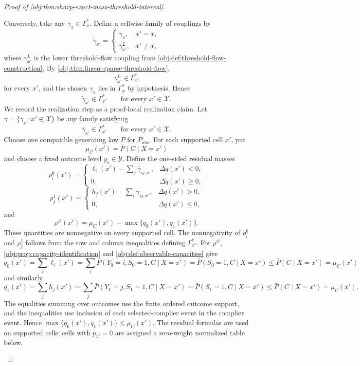 \documentclass[11pt]{article}
\begin{document}
\begin{proof}[Proof of \cref{obj:thm:sharp-exact-mass-threshold-interval}]
\begin{enumerate}
Conversely, take any \(\gamma_x\in\Gamma_x^\ast\).  Define a cellwise family of couplings by
\[
\widetilde\gamma_{x'}=
\begin{cases}
\gamma_x, & x'=x,\\
\gamma_{x'}^L, & x'\ne x,
\end{cases}
\]
where \(\gamma_{x'}^L\) is the lower threshold-flow coupling from
\cref{obj:def:threshold-flow-construction}.  By
\cref{obj:thm:linear-sparse-threshold-flow},
\[
\gamma_{x'}^L\in\Gamma_{x'}^\ast
\]
for every \(x'\), and the chosen \(\gamma_x\) lies in \(\Gamma_x^\ast\) by hypothesis.  Hence
\[
\widetilde\gamma_{x'}\in\Gamma_{x'}^\ast\qquad\text{for every }x'\in\mathcal X .
\]
We record the realization step as a proof-local realization claim.  Let \(\bar\gamma=\{\bar\gamma_{x'}:x'\in\mathcal X\}\) be any family satisfying
\[
\bar\gamma_{x'}\in\Gamma_{x'}^\ast\qquad\text{for every }x'\in\mathcal X .
\]
Choose one compatible generating law \(\bar P\) for \(P_{\mathrm{obs}}\).  For each supported cell \(x'\), put
\[
\mu_C(x')=\bar P(C\mid X=x')
\]
and choose a fixed outcome level \(y_\star\in\mathcal Y\).  Define the one-sided residual masses
\[
\rho_i^0(x')=
\begin{cases}
\ell_i(x')-\sum_j\bar\gamma_{ij,x'}, & \Delta q(x')<0,\\
0, & \Delta q(x')\ge0,
\end{cases}
\]
\[
\rho_j^1(x')=
\begin{cases}
h_j(x')-\sum_i\bar\gamma_{ij,x'}, & \Delta q(x')>0,\\
0, & \Delta q(x')\le0,
\end{cases}
\]
and
\[
\rho^\varnothing(x')=\mu_C(x')-\max\{q_0(x'),q_1(x')\}.
\]
These quantities are nonnegative on every supported cell.  The nonnegativity of \(\rho_i^0\) and \(\rho_j^1\) follows from the row and column inequalities defining \(\Gamma_{x'}^\ast\).  For \(\rho^\varnothing\), \cref{obj:prop:capacity-identification} and \cref{obj:def:observable-capacities} give
\[
q_0(x')=\sum_i\ell_i(x')
=\sum_i \bar P(Y_0=i,S_0=1,C\mid X=x')
=\bar P(S_0=1,C\mid X=x')
\le \bar P(C\mid X=x')=\mu_C(x')
\]
and similarly
\[
q_1(x')=\sum_j h_j(x')
=\sum_j \bar P(Y_1=j,S_1=1,C\mid X=x')
=\bar P(S_1=1,C\mid X=x')
\le \bar P(C\mid X=x')=\mu_C(x').
\]
The equalities summing over outcomes use the finite ordered outcome support, and the inequalities use inclusion of each selected-complier event in the complier event.  Hence \(\max\{q_0(x'),q_1(x')\}\le\mu_C(x')\).  The residual formulas are used on supported cells; cells with \(p_{x'}=0\) are assigned a zero-weight normalized table below.


\end{enumerate}
\end{proof}
\end{document}
